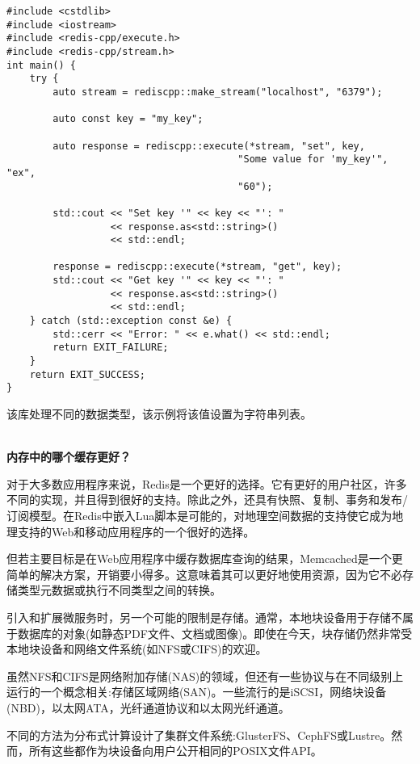 \begin{lstlisting}[style=styleCXX]
#include <cstdlib>
#include <iostream>
#include <redis-cpp/execute.h>
#include <redis-cpp/stream.h>
int main() {
	try {
		auto stream = rediscpp::make_stream("localhost", "6379");
		
		auto const key = "my_key";
		
		auto response = rediscpp::execute(*stream, "set", key,
										"Some value for 'my_key'", "ex",
										"60");
		
		std::cout << "Set key '" << key << "': "
				  << response.as<std::string>()
				  << std::endl;
		
		response = rediscpp::execute(*stream, "get", key);
		std::cout << "Get key '" << key << "': "
				  << response.as<std::string>()
				  << std::endl;
	} catch (std::exception const &e) {
		std::cerr << "Error: " << e.what() << std::endl;
		return EXIT_FAILURE;
	}
	return EXIT_SUCCESS;
}
\end{lstlisting}

该库处理不同的数据类型，该示例将该值设置为字符串列表。

\hspace*{\fill} \\ %
\noindent
\textbf{内存中的哪个缓存更好？}

对于大多数应用程序来说，Redis是一个更好的选择。它有更好的用户社区，许多不同的实现，并且得到很好的支持。除此之外，还具有快照、复制、事务和发布/订阅模型。在Redis中嵌入Lua脚本是可能的，对地理空间数据的支持使它成为地理支持的Web和移动应用程序的一个很好的选择。

但若主要目标是在Web应用程序中缓存数据库查询的结果，Memcached是一个更简单的解决方案，开销要小得多。这意味着其可以更好地使用资源，因为它不必存储类型元数据或执行不同类型之间的转换。


引入和扩展微服务时，另一个可能的限制是存储。通常，本地块设备用于存储不属于数据库的对象(如静态PDF文件、文档或图像)。即使在今天，块存储仍然非常受本地块设备和网络文件系统(如NFS或CIFS)的欢迎。

虽然NFS和CIFS是网络附加存储(NAS)的领域，但还有一些协议与在不同级别上运行的一个概念相关:存储区域网络(SAN)。一些流行的是iSCSI，网络块设备(NBD)，以太网ATA，光纤通道协议和以太网光纤通道。

不同的方法为分布式计算设计了集群文件系统:GlusterFS、CephFS或Lustre。然而，所有这些都作为块设备向用户公开相同的POSIX文件API。


